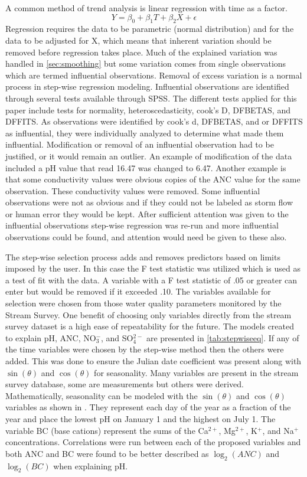 A common method of trend analysis is linear regression with time as a factor.
\begin{equation} \label{eq:regression}
	Y={\beta_0 + \beta_1  T + \beta_2  X + \epsilon}
\end{equation}
Regression requires the data to be parametric (normal distribution) and for the data to be adjusted for X, which means that inherent variation should be removed before regression takes place.
Much of the explained variation was handled in \autoref{sec:smoothing} but some variation comes from single observations which are termed influential observations.
Removal of excess variation is a normal process in step-wise regression modeling.
Influential observations are identified through several tests available through SPSS.
The different tests applied for this paper include tests for normality, heteroscedasticity, cook's D, DFBETAS, and DFFITS. 
As observations were identified by cook's d, DFBETAS, and or DFFITS as influential, they were individually analyzed to determine what made them influential. 
Modification or removal of an influential observation had to be justified, or it would remain an outlier. 
An example of modification of the data included a pH value that read 16.47 was changed to 6.47. Another example is that some conductivity values were obvious copies of the ANC value for the same observation. 
These conductivity values were removed. 
Some influential observations were not as obvious and if they could not be labeled as storm flow or human error they would be kept.
After sufficient attention was given to the influential observations step-wise regression was re-run and more influential observations could be found, and attention would need be given to these also. 

The step-wise selection process adds and removes predictors based on limits imposed by the user.
In this case the F test statistic was utilized which is used as a test of fit with the data.
A variable with a F test statistic of .05 or greater can enter but would be removed if it exceeded .10. 
The variables available for selection were chosen from those water quality parameters monitored by the Stream Survey. 
One benefit of choosing only variables directly from the stream survey dataset is a high ease of repeatability for the future. 
The models created to explain pH, ANC, NO$_3^-$, and SO$_4^{2-}$ are presented in \autoref{tab:stepwiseeq}.
If any of the time variables were chosen by the step-wise method then the others were added.  
This was done to ensure the Julian date coefficient was present along with $\sin(\theta)$ and $\cos(\theta)$ for seasonality.  
Many variables are present in the stream survey database, some are measurements but others were derived.  
Mathematically, seasonality can be modeled with the $\sin(\theta)$ and $\cos(\theta)$ variables as shown in \citet{helsel1992statistical}. 
They represent each day of the year as a fraction of the year and place the lowest pH on January 1 and the highest on July 1.  
The variable BC (base cations) represent the sums of the Ca$^{2+}$, Mg$^{2+}$, K$^+$, and Na$^+$ concentrations.  
Correlations were run between each of the proposed variables  and both ANC and BC were found to be better described as $\log_2(ANC)$ and $\log_2(BC)$ when explaining pH.
 

